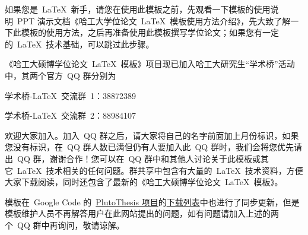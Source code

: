 

如果您是~\LaTeX~新手，请您在使用此模板之前，先观看一下模板的使用说明~PPT 演示文档《哈工大学位论文~\LaTeX~模板使用方法介绍》，先大致了解一下此模板的使用方法，之后再准备使用此模板撰写学位论文；如果您有一定的~\LaTeX~技术基础，可以跳过此步骤。

《哈工大硕博学位论文~\LaTeX~模板》项目现已加入哈工大研究生“学术桥”活动中，其两个官方~QQ 群分别为

\centerline{学术桥-\LaTeX~交流群~1：38872389}
\centerline{学术桥-\LaTeX~交流群~2：88984107}
\noindent 欢迎大家加入。加入~QQ 群之后，请大家将自己的名字前面加上月份标识，如果您没有标识，在~QQ 群人数已满但仍有人要加入此~QQ 群时，我们会将您优先请出~QQ 群，谢谢合作！您可以在~QQ 群中和其他人讨论关于此模板或其它~\LaTeX~技术相关的任何问题。群共享中包含有大量的~\LaTeX~技术资料，方便大家下载阅读，同时还包含了最新的《哈工大硕博学位论文~\LaTeX~模板》。

模板在~Google Code 的~\href{http://code.google.com/p/plutothesis/}{PlutoThesis 项目}的\href{http://code.google.com/p/plutothesis/downloads/list}{下载列表}中也进行了同步更新，但是模板维护人员不再解答用户在此网站提出的问题，如有问题请加入上述的两个~QQ 群中再询问，敬请谅解。